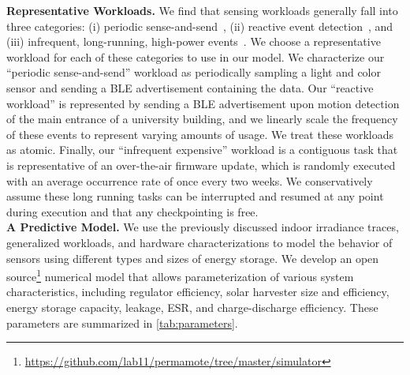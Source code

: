 \vspace{-6pt}
\noindent
\textbf{Representative Workloads.}
We find that sensing workloads generally fall into three
categories: (i) periodic sense-and-send~\cite{mainwaring2002wireless}, (ii) reactive event detection~\cite{campbellEnergy14}, and (iii) infrequent,
long-running, high-power events~\cite{levis2004trickle}. We choose a representative workload for each
of these categories to use in our model.
We characterize our ``periodic sense-and-send''
workload as periodically sampling a light and color sensor and sending a
BLE
advertisement containing the data.
Our ``reactive workload'' is
represented by sending a BLE advertisement upon motion detection of the main
entrance of a university building, and we linearly scale the frequency
of these events to represent varying amounts of usage. We treat these
workloads as atomic.  Finally, our ``infrequent expensive'' workload is a
contiguous
task that is representative of an
over-the-air firmware update, which is randomly executed with an average occurrence rate
of once every two weeks.
We conservatively assume these long running tasks can be interrupted
and resumed at any point during execution and that any checkpointing is free.
\\

\vspace{-6pt}
\noindent
\textbf{A Predictive Model.}
We use the previously discussed indoor irradiance traces, generalized
workloads, and hardware characterizations to model the behavior of sensors
using different types and sizes of energy storage. We develop an open
source\footnote{\url{https://github.com/lab11/permamote/tree/master/simulator}}
numerical model that allows parameterization of various system
characteristics, including regulator efficiency, solar harvester size
and efficiency, energy storage capacity, leakage, ESR, and charge-discharge
efficiency. These parameters are summarized in \cref{tab:parameters}.

